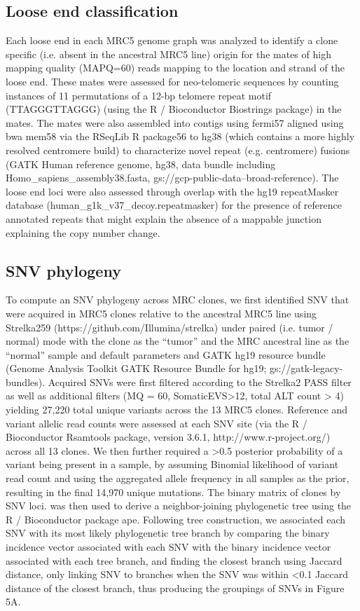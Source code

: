 \documentclass[phd,tocprelim]{cornell}
\begin{document}
\subsection*{Loose end classification} \label{app:tc_loose_end}
Each loose end in each MRC5 genome graph was analyzed to identify a clone specific (i.e. absent in the ancestral MRC5 line) origin for the mates of high mapping quality (MAPQ=60) reads mapping to the location and strand of the loose end. These mates were assessed for neo-telomeric sequences by counting instances of 11 permutations of a 12-bp telomere repeat motif (TTAGGGTTAGGG) (using the R / Bioconductor Biostrings package) in the mates. The mates were also assembled into contigs using fermi57 aligned using bwa mem58 via the RSeqLib R package56 to hg38 (which contains a more  highly resolved centromere build) to characterize novel repeat (e.g. centromere) fusions (GATK Human reference genome, hg38, data bundle including Homo\_sapiens\_assembly38.fasta, gs://gcp-public-data--broad-reference). The loose end loci were also assessed through overlap with the hg19 repeatMasker database (human\_g1k\_v37\_decoy.repeatmasker) for the presence of reference annotated repeats that might explain the absence of a mappable junction explaining the copy number change.  

\subsection*{SNV phylogeny}
To compute an SNV phylogeny across MRC clones, we first identified SNV that were acquired in MRC5 clones relative to the ancestral MRC5 line using Strelka259 (https://github.com/Illumina/strelka) under paired (i.e. tumor / normal) mode with the clone as the “tumor” and the MRC ancestral line as the “normal” sample and default parameters and GATK hg19 resource bundle (Genome Analysis Toolkit GATK Resource Bundle for hg19; gs://gatk-legacy-bundles). Acquired SNVs were first filtered according to the Strelka2 PASS filter as well as additional filters (MQ = 60, SomaticEVS>12, total ALT count > 4) yielding 27,220 total unique variants across the 13 MRC5 clones. Reference and variant allelic read counts were assessed at each SNV site (via the R / Bioconductor Rsamtools package, version 3.6.1, http://www.r-project.org/) across all 13 clones. We then further required a >0.5 posterior probability of a variant being present in a sample, by assuming Binomial likelihood of variant read count and using the aggregated allele frequency in all samples as the prior, resulting in the final 14,970 unique mutations. The binary matrix of clones by SNV loci. was then used to derive a neighbor-joining phylogenetic tree using the R / Bioconductor package ape. Following tree construction, we associated each SNV with its most likely phylogenetic tree branch by comparing the binary incidence vector associated with each SNV with the binary incidence vector associated with each tree branch, and finding the closest branch using Jaccard distance, only linking SNV to branches when the SNV was within <0.1 Jaccard distance of the closest branch, thus producing the groupings of SNVs in Figure 5A.   
\end{document}
